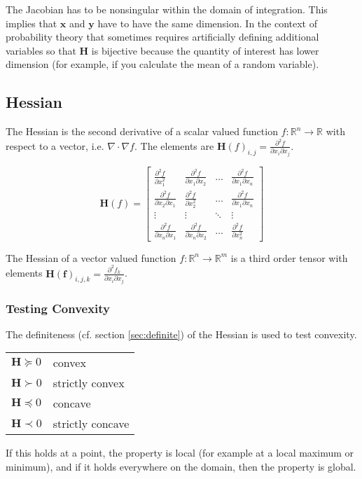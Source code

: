 The Jacobian has to be nonsingular within the domain of integration. This implies that $\mathbf{x}$ and $\mathbf{y}$ have to have the same dimension. In the context of probability theory that sometimes requires artificially defining additional variables so that $\mathbf{H}$ is bijective because the quantity of interest has lower dimension (for example, if you calculate the mean of a random variable). 

\subsection{Hessian}
\label{sec:hessian}

The Hessian is the second derivative of a scalar valued function $f:\mathbb{R}^{n} \rightarrow \mathbb{R}$ with respect to a vector, i.e. $\nabla\cdot\nabla f$. The elements are $\mathbf{H}(f)_{i,j} = \frac{\partial^2 f}{\partial x_i\partial x_j}$. 

\begin{equation}
\mathbf{H}(f) = \left[\begin{array}{cccc}
\frac{\partial^2f}{\partial x_1^2}&\frac{\partial^2f}{\partial x_1\partial x_2} & \hdots & \frac{\partial^2f}{\partial x_1\partial x_n}\\
\frac{\partial^2f}{\partial x_2\partial x_1}&\frac{\partial^2f}{\partial x_2^2} & \hdots & \frac{\partial^2f}{\partial x_1\partial x_n}\\
\vdots & \vdots & \ddots & \vdots \\
\frac{\partial^2f}{\partial x_n\partial x_1}&\frac{\partial^2f}{\partial x_n\partial x_2} & \hdots & \frac{\partial^2f}{\partial x_n^2}
\end{array} \right]
\end{equation}

The Hessian of a vector valued function $f:\mathbb{R}^n \rightarrow \mathbb{R}^m$ is a third order tensor with elements  $\mathbf{H}(\mathbf{f})_{i,j,k} = \frac{\partial^2 f_k}{\partial x_i\partial x_j}$.

\subsubsection{Testing Convexity}
The definiteness (cf. section \ref{sec:definite}) of the Hessian is used to test convexity.

\begin{tabular}{ll}
$\mathbf{H}\succeq 0$ & convex\\
$\mathbf{H}\succ 0$ & strictly convex\\
$\mathbf{H}\preceq 0$ & concave\\
$\mathbf{H}\prec 0$ & strictly concave\\
\end{tabular}

If this holds at a point, the property is local (for example at a local maximum or minimum), and if it holds everywhere on the domain, then the property is global.

